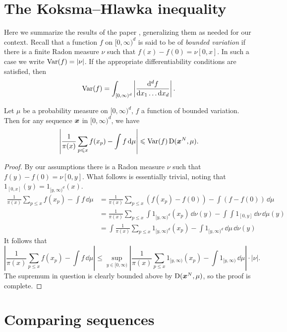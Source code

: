 \section{The Koksma--Hlawka inequality}

Here we summarize the results of the paper \cite{okten-1999}, generalizing them 
as needed for our context. Recall that a function $f$ on $[0,\infty)^d$ is 
said to be of \emph{bounded variation} if there is a finite Radon measure $\nu$ 
such that $f(x) - f(0) = \nu[0,x]$. In such a case we write 
$\operatorname{Var}(f) = |\nu|$. If the appropriate differentiability conditions are 
satisfied, then 
\[
	\operatorname{Var}(f) = \int_{[0,\infty)^d} \left|\frac{\mathrm{d}^d f}{\mathrm{d} x_1 \dots \mathrm{d} x_d} \right|.
\]

\begin{theorem}
Let $\mu$ be a probability measure on $[0,\infty)^d$, $f$ a function of 
bounded variation. Then for any sequence ${\boldsymbol x}$ in $[0,\infty)^d$, we have 
\[
	\left| \frac{1}{\pi(x)} \sum_{p\leqslant x} f(x_p) - \int f\, \mathrm{d}\mu \right| \leqslant \operatorname{Var}(f) \operatorname{D}({\boldsymbol x}^N,\mu) .
\]
\end{theorem}
\begin{proof}
By our assumptions there is a Radon measure $\nu$ such that 
$f(y) - f(0) = \nu[0,y]$. What follows is essentially trivial, noting that 
$1_{[0,x]}(y) = 1_{[y,\infty)^d}(x)$. 
\begin{align*}
	\frac{1}{\pi(x)} \sum_{p\leqslant x} f(x_p) - \int f\, \dd\mu 
		&= \frac{1}{\pi(x)} \sum_{p\leqslant x} \left(f(x_p) - f(0)\right) - \int \left(f - f(0)\right)\, \dd\mu \\
		&= \frac{1}{\pi(x)} \sum_{p\leqslant x} \int 1_{[y,\infty)^d}(x_p)\, \dd \nu(y) - \int \int 1_{[0,y]}\, \dd\nu \, \dd\mu(y) \\
		&= \int \frac{1}{\pi(x)} \sum_{p\leqslant x} 1_{[y,\infty)^d}(x_p) - \int 1_{[y,\infty)^d}\, \dd\mu \, \dd\nu(y)
\end{align*}
It follows that 
\[
	\left| \frac{1}{\pi(x)} \sum_{p\leqslant x} f(x_p) - \int f\, \dd\mu \right|
		\leqslant \sup_{y\in [0,\infty)} \left| \frac{1}{\pi(x)} \sum_{p\leqslant x} 1_{[y,\infty)}(x_p) - \int 1_{[y,\infty)}\, \dd\mu\right| \cdot |\nu| .
\]
The supremum in question is clearly bounded above by $\operatorname{D}({\boldsymbol x}^N,\mu)$, so the 
proof is complete. 
\end{proof}





\section{Comparing sequences}

